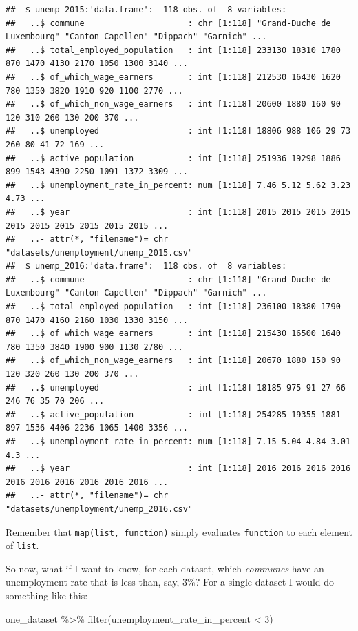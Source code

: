 \documentclass[
]{article}
\newenvironment{Shaded}{\begin{snugshade}}{\end{snugshade}}
\newcommand{\DecValTok}[1]{\textcolor[rgb]{0.00,0.00,0.81}{#1}}
\newcommand{\FunctionTok}[1]{\textcolor[rgb]{0.00,0.00,0.00}{#1}}
\newcommand{\NormalTok}[1]{#1}
\newcommand{\SpecialCharTok}[1]{\textcolor[rgb]{0.00,0.00,0.00}{#1}}
\begin{document}
\begin{verbatim}
##  $ unemp_2015:'data.frame':  118 obs. of  8 variables:
##   ..$ commune                     : chr [1:118] "Grand-Duche de Luxembourg" "Canton Capellen" "Dippach" "Garnich" ...
##   ..$ total_employed_population   : int [1:118] 233130 18310 1780 870 1470 4130 2170 1050 1300 3140 ...
##   ..$ of_which_wage_earners       : int [1:118] 212530 16430 1620 780 1350 3820 1910 920 1100 2770 ...
##   ..$ of_which_non_wage_earners   : int [1:118] 20600 1880 160 90 120 310 260 130 200 370 ...
##   ..$ unemployed                  : int [1:118] 18806 988 106 29 73 260 80 41 72 169 ...
##   ..$ active_population           : int [1:118] 251936 19298 1886 899 1543 4390 2250 1091 1372 3309 ...
##   ..$ unemployment_rate_in_percent: num [1:118] 7.46 5.12 5.62 3.23 4.73 ...
##   ..$ year                        : int [1:118] 2015 2015 2015 2015 2015 2015 2015 2015 2015 2015 ...
##   ..- attr(*, "filename")= chr "datasets/unemployment/unemp_2015.csv"
##  $ unemp_2016:'data.frame':  118 obs. of  8 variables:
##   ..$ commune                     : chr [1:118] "Grand-Duche de Luxembourg" "Canton Capellen" "Dippach" "Garnich" ...
##   ..$ total_employed_population   : int [1:118] 236100 18380 1790 870 1470 4160 2160 1030 1330 3150 ...
##   ..$ of_which_wage_earners       : int [1:118] 215430 16500 1640 780 1350 3840 1900 900 1130 2780 ...
##   ..$ of_which_non_wage_earners   : int [1:118] 20670 1880 150 90 120 320 260 130 200 370 ...
##   ..$ unemployed                  : int [1:118] 18185 975 91 27 66 246 76 35 70 206 ...
##   ..$ active_population           : int [1:118] 254285 19355 1881 897 1536 4406 2236 1065 1400 3356 ...
##   ..$ unemployment_rate_in_percent: num [1:118] 7.15 5.04 4.84 3.01 4.3 ...
##   ..$ year                        : int [1:118] 2016 2016 2016 2016 2016 2016 2016 2016 2016 2016 ...
##   ..- attr(*, "filename")= chr "datasets/unemployment/unemp_2016.csv"
\end{verbatim}

Remember that \texttt{map(list,\ function)} simply evaluates \texttt{function} to each element of \texttt{list}.

So now, what if I want to know, for each dataset, which \emph{communes} have an unemployment rate that is
less than, say, 3\%? For a single dataset I would do something like this:

\begin{Shaded}
\begin{Highlighting}[]
\NormalTok{one\_dataset }\SpecialCharTok{\%\textgreater{}\%}
  \FunctionTok{filter}\NormalTok{(unemployment\_rate\_in\_percent }\SpecialCharTok{\textless{}} \DecValTok{3}\NormalTok{)}
\end{Highlighting}
\end{Shaded}
\end{document}
